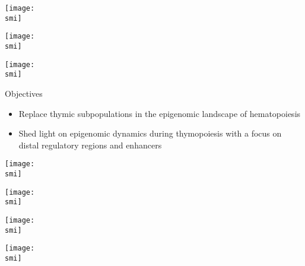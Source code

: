\documentclass[10pt]{beamer}
\def\smi{out/ln/updir/mw-gcthesis-oral/library.bib}
\begin{document}
\begin{frame}[plain]
  \def\smi{out/ln/updir/mw-gcthesis-oral/ink/thymus/3.pdf}
  \texttt{[image: \\smi]}
\end{frame}
\begin{frame}[plain]
  \def\smi{out/ln/updir/mw-gcthesis-oral/ink/thymus/4.pdf}
  \texttt{[image: \\smi]}
\end{frame}
\begin{frame}[plain]
  \def\smi{out/ln/updir/mw-gcthesis-oral/ink/thymus/5.pdf}
  \texttt{[image: \\smi]}
\end{frame}
\begin{frame}[plain]{Objectives}
  \begin{itemize}
    \item Replace thymic subpopulations in the epigenomic landscape of hematopoiesis
    \item Shed light on epigenomic dynamics during thymopoiesis with a focus on distal regulatory regions and enhancers
  \end{itemize}
\end{frame}
\begin{frame}[plain]
  \def\smi{out/ln/updir/mw-gcthesis-oral/ink/tSNE-WGBS.pdf}
  \texttt{[image: \\smi]}
\end{frame}
\begin{frame}[plain]
  \def\smi{out/ln/updir/mw-gcthesis-oral/ink/chromatin-states/matrix-model.pdf}
  \texttt{[image: \\smi]}
\end{frame}
\begin{frame}[plain]
  \def\smi{out/ln/updir/mw-gcthesis-oral/ink/chromatin-states/matrix-model.pdf}
  \texttt{[image: \\smi]}
\end{frame}
\begin{frame}[plain]
  \def\smi{out/ln/updir/mw-gcthesis-oral/ink/chromatin-states/matrix-mca.pdf}
  \texttt{[image: \\smi]}
\end{frame}
\end{document}
